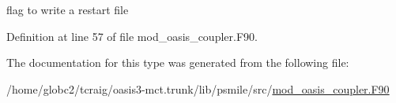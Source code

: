 flag to write a restart file 



Definition at line 57 of file mod\+\_\+oasis\+\_\+coupler.\+F90.



The documentation for this type was generated from the following file\+:\begin{DoxyCompactItemize}
\item 
/home/globc2/tcraig/oasis3-\/mct.\+trunk/lib/psmile/src/\hyperlink{mod__oasis__coupler_8_f90}{mod\+\_\+oasis\+\_\+coupler.\+F90}\end{DoxyCompactItemize}
